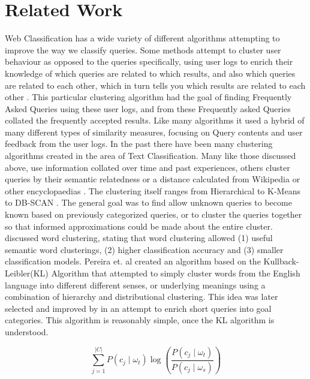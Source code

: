 \documentclass[letterpaper]{article}
\begin{document}
\section{Related Work}
Web Classification has a wide variety of different algorithms attempting to improve the way we classify queries.
Some methods attempt to cluster user behaviour as opposed to the queries specifically, using user logs to enrich their knowledge of which queries are related to which results, and also which queries are related to each other, which in turn tells you which results are related to each other \cite{wen2001clustering}. This particular clustering algorithm had the goal of finding Frequently Asked Queries using these user logs, and from these
Frequently asked Queries collated the frequently accepted results. Like many algorithms it used a hybrid of many different types of similarity measures, focusing on Query contents and user feedback from the user logs.
In the past there have been many clustering algorithms created in the area of Text Classification. Many like those discussed above, use information collated over time and past experiences, others cluster queries by their semantic relatedness or a distance calculated from Wikipedia or other encyclopaedias \cite{hu2009exploiting}. The clustering itself ranges from Hierarchical to K-Means \cite{hartigan1979algorithm,hu2009exploiting} to DB-SCAN \cite{wen2001clustering}. The general goal was to find allow unknown queries to become known based on previously categorized queries, or to cluster the queries together so that informed approximations could be made about the entire cluster. \cite{baker1998distributional} discussed word clustering, stating that word clustering allowed (1) useful semantic word clusterings, (2) higher classification accuracy and (3) smaller classification models.
Pereira et. al \cite{pereira1993distributional} created an algorithm based on the Kullback-Leibler(KL) Algorithm \cite{kullback1987kullback} that attempted to simply cluster words from the English language into different different senses, or underlying meanings using a combination of hierarchy and distributional clustering. This idea was later selected and improved by \cite{baker1998distributional} in an attempt to enrich short queries into goal categories. This algorithm is reasonably simple, once the KL algorithm is understood. 

\begin{equation}
\sum\limits_{j=1}^{|C|} P(c_{j} \mid \omega_{t})\log(\frac{P(c_{j} \mid \omega_{t})}{P(c_{j} \mid \omega_{s})})
\end{equation}
\end{document}
